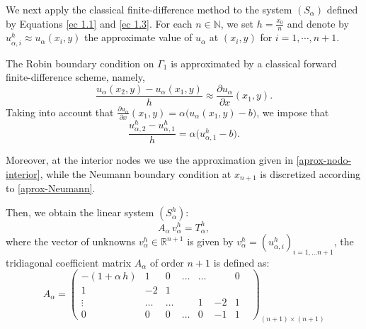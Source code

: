 \documentclass[axioms,article,submit,moreauthors]{Definitions/mdpi}
\begin{document}
    

  We next apply the classical finite-difference method to the system $(S_\alpha)$ defined by Equations \eqref{ec 1.1} and \eqref{ec 1.3}. {For each $n\in\mathbb{N}$, we set $h=\frac{x_0}{n}$ and denote by $u^h_{\alpha,i} \approx u_\alpha(x_i,y)$ the approximate value of $u_\alpha$ at $(x_i,y)$} for $i=1,\cdots,n+1$.

The Robin boundary condition on $\Gamma_1$ is approximated by a {classical forward finite-difference scheme}, namely,
\begin{equation}
{\frac{u_\alpha(x_2,y)-u_\alpha(x_1,y)}{h}\approx \frac{\partial u_\alpha}{\partial x}(x_1,y)}.
\end{equation}
{Taking into account that $\frac{\partial u_\alpha}{\partial x}(x_1,y)
=\alpha\bigl(u_\alpha(x_1,y)-b\bigr)$, we impose that}
\begin{equation}\label{Robin-Clasica}
{\frac{{u^h_{\alpha,2}}-{u^h_{\alpha,1}}}{h}
= \alpha \bigl({u^h_{\alpha,1}}-b\bigr).}
\end{equation}

Moreover, at the interior nodes we use the approximation given in \eqref{aprox-nodo-interior}, while the Neumann boundary condition at $x_{n+1}$ is discretized according to \eqref{aprox-Neumann}.

Then, we obtain the linear system ${(S^h_{\alpha})}$:
       \[A_\alpha \, {v^h_\alpha} = {T^h_\alpha},\]
 \noindent where the vector of unknowns ${v^h_\alpha} \in  \mathbb{R}^{n+1}$ is given by ${v^h_\alpha} = ({u^h_{\alpha,i}} )_{i= 1,\ldots n+1}$,  the tridiagonal coefficient matrix  $A_\alpha$  of order $n+1$ is defined as: 
  \begin{equation}\label{matrizAalpha}
     					A_{\alpha}=\begin{pmatrix}
                                                            -(1+\alpha\,h) & 1 & 0 & \ldots & \ldots & & 0 &\\                                                                                                   
                                                             1 &-2 & 1& \\
                                                             \vdots &
                                                             \ldots & \ldots & &1 & -2 & 1\\
                                                              0 & 0& 0& \ldots &  0& -1 &1
                                                    \end{pmatrix}_{(n+1)\times (n+1)}
                                                    \end{equation}
                                                    
\end{document}
